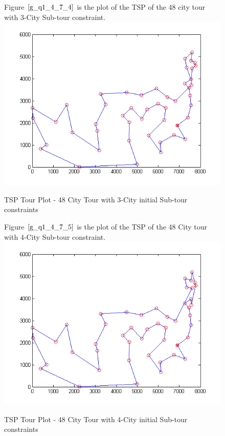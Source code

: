 \documentclass[twoside,12pt]{article}
\begin{document}
\begin{figure}[!htbp]
\centering
Figure $\eqref{g_q1_4_7_4}$ is the plot of the TSP of the 48 city tour with 3-City Sub-tour constraint. 
 \includegraphics[scale=1.4]{3_city/all_48_with_3} 
\caption{TSP Tour Plot - 48 City Tour with 3-City initial Sub-tour constraints}
\label{g_q1_4_7_4}
\end{figure}
\FloatBarrier


\begin{figure}[!htbp]
\centering
Figure $\eqref{g_q1_4_7_5}$ is the plot of the TSP of the 48 City tour with 4-City Sub-tour constraint. 
 \includegraphics[scale=1.3]{4_city/all_48_with_4} 
\caption{TSP Tour Plot - 48 City Tour with 4-City initial Sub-tour constraints}
\label{g_q1_4_7_5}
\end{figure}
\FloatBarrier
\end{document}
